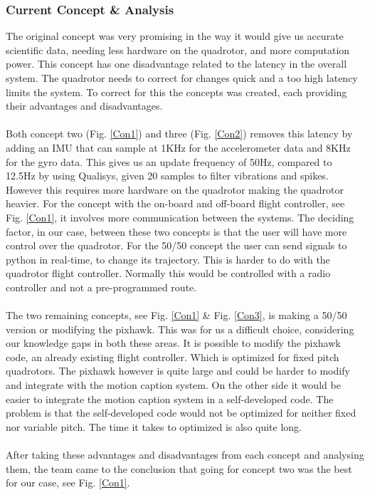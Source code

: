 \subsubsection{Current Concept \& Analysis}
The original concept was very promising in the way it would give us accurate scientific data, needing less hardware on the quadrotor, and more computation power. This concept has one disadvantage related to the latency in the overall system. The quadrotor needs to correct for changes quick and a too high latency limits the system. To correct for this the concepts was created, each providing their advantages and disadvantages. 
\\\\
Both concept two (Fig. \ref{Con1}) and three (Fig. \ref{Con2}) removes this latency by adding an IMU that can sample at 1KHz for the accelerometer data and 8KHz for the gyro data. This gives us an update frequency of 50Hz, compared to 12.5Hz by using Qualisys, given 20 samples to filter vibrations and spikes. However this requires more hardware on the quadrotor making the quadrotor heavier. For the concept with the on-board and off-board flight controller, see Fig. \ref{Con1}, it involves more communication between the systems. The deciding factor, in our case, between these two concepts is that the user will have more control over the quadrotor. For the 50/50 concept the user can send signals to python in real-time, to change its trajectory. This is harder to do with the quadrotor flight controller. Normally this would be controlled with a radio controller and not a pre-programmed route. 
\\\\
The two remaining concepts, see Fig. \ref{Con1} \& Fig. \ref{Con3}, is making a 50/50 version or modifying the pixhawk. This was for us a difficult choice, considering our knowledge gaps in both these areas. It is possible to modify the pixhawk code, an already existing flight controller. Which is optimized for fixed pitch quadrotors. The pixhawk however is quite large and could be harder to modify and integrate with the motion caption system. On the other side it would be easier to integrate the motion caption system in a self-developed code. The problem is that the self-developed code would not be optimized for neither fixed nor variable pitch. The time it takes to optimized is also quite long.
\\\\
After taking these advantages and disadvantages from each concept and analysing them, the team came to the conclusion that going for concept two was the best for our case, see Fig. \ref{Con1}. 

